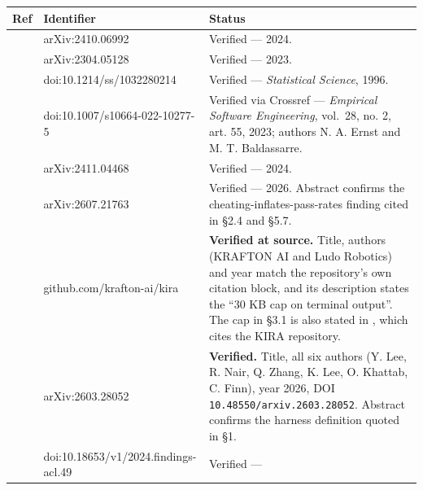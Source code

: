 \documentclass[
  10pt,
  a4paper,
]{article}
\newcounter{none} %
\let\oldtexttt\texttt
\renewcommand{\texttt}[1]{{\small\oldtexttt{#1}}}
\begin{document}
{\def\LTcaptype{none} %
\begin{longtable}[]{@{}
  >{\raggedright\arraybackslash}p{}
  >{\raggedright\arraybackslash}p{}
  >{\raggedright\arraybackslash}p{}@{}}
\toprule\noalign{}
\begin{minipage}[b]{\linewidth}\raggedright
Ref
\end{minipage} & \begin{minipage}[b]{\linewidth}\raggedright
Identifier
\end{minipage} & \begin{minipage}[b]{\linewidth}\raggedright
Status
\end{minipage} \\
\midrule\noalign{}
\endhead
\bottomrule\noalign{}
\endlastfoot
\citet{aleithan2024swebenchplus} & arXiv:2410.06992 & Verified ---
2024. \\
\citet{chen2023selfdebug} & arXiv:2304.05128 & Verified --- 2023. \\
\citet{diciccio1996bootstrap} & doi:10.1214/ss/1032280214 & Verified ---
\emph{Statistical Science}, 1996. \\
\citet{ernst2023registered} & doi:10.1007/s10664-022-10277-5 & Verified
via Crossref --- \emph{Empirical Software Engineering}, vol.~28, no. 2,
art. 55, 2023; authors N. A. Ernst and M. T. Baldassarre. \\
\citet{fourney2024magenticone} & arXiv:2411.04468 & Verified ---
2024. \\
\citet{kouremetis2026cheats} & arXiv:2607.21763 & Verified --- 2026.
Abstract confirms the cheating-inflates-pass-rates finding cited in §2.4
and §5.7. \\
\citet{krafton2026kira} & github.com/krafton-ai/kira & \textbf{Verified
at source.} Title, authors (KRAFTON AI and Ludo Robotics) and year match
the repository's own citation block, and its description states the ``30
KB cap on terminal output''. The cap in §3.1 is also stated in
\citet[App. B.3]{lee2026metaharness}, which cites the KIRA
repository. \\
\citet{lee2026metaharness} & arXiv:2603.28052 & \textbf{Verified.}
Title, all six authors (Y. Lee, R. Nair, Q. Zhang, K. Lee, O. Khattab,
C. Finn), year 2026, DOI \texttt{10.48550/arxiv.2603.28052}. Abstract
confirms the harness definition quoted in §1. \\
\citet{li2024ldb} & doi:10.18653/v1/2024.findings-acl.49 & Verified ---

\end{longtable}}
\end{document}
